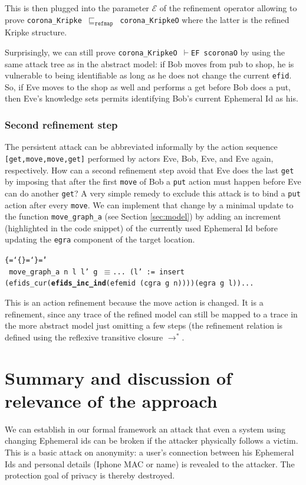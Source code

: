 \documentclass{llncs}
\newenvironment{ttbox}{\begin{alltt}\ttbraces\small\tt}%
                      {\end{alltt}}
\def\ttbraces{\let\.=\nobreak\chardef\{=`\{\chardef\}=`\}\chardef\|=`\\}
\newcommand\ttequiv{\mbox{{$\equiv$}}}
\newcommand\ttrelIstar{\mbox{{$\to^*$}}}
\newcommand\ttvdash{\mbox{{$\vdash$}}}
\newcommand\ttref[1]{\mbox{\(\sqsubseteq_{#1}\)}}
\newcommand\ttecal{\mbox{$\mathcal{E}$}}
\begin{document}
This is then plugged into the parameter \texttt{\ttecal} of the refinement operator allowing to
prove \texttt{corona\_Kripke \ttref{\texttt{refmap}} corona\_KripkeO} where the latter is the
refined Kripke structure.

Surprisingly, we can still prove \texttt{corona\_KripkeO \ttvdash EF scoronaO} by using the
same attack tree as in the abstract model: if Bob moves from pub to shop, he is vulnerable to
being identifiable as long as he does not change the current \texttt{efid}. So, if Eve moves to
the shop as well and performs a get before Bob does a put, then Eve's knowledge sets permits identifying
Bob's current Ephemeral Id as his.

\subsubsection{Second refinement step}
The persistent attack can be abbreviated informally by the action sequence \texttt{[get,move,move,get]}
performed by actors Eve, Bob, Eve, and Eve again, respectively.
How can a second refinement step avoid that Eve does the last \texttt{get} by imposing that after the
first \texttt{move} of Bob a \texttt{put} action must happen before Eve can do another \texttt{get}?
A very simple remedy to exclude this attack is to bind a \texttt{put} action after every \texttt{move}.
We can implement that change by a minimal update to the function \texttt{move\_graph\_a} (see Section \ref{sec:model})
by adding an increment (highlighted in the code snippet)
of the currently used Ephemeral Id before updating the \texttt{egra} component of the target location.
\begin{ttbox}
move\_graph\_a n l l' g \ttequiv ...
  (l' := insert (efids_cur({\bf efids\_inc\_ind}(efemid (cgra g n))))(egra g l))...
\end{ttbox}  
This is an action refinement because the move action is changed. It is a refinement, since
any trace of the refined model can still be mapped to a trace in the more abstract model just
omitting a few steps (the refinement relation is defined using the reflexive transitive closure
\texttt{\ttrelIstar}.


\section{Summary and discussion of relevance of the approach}
\label{sec:concl}
We can establish in our formal framework an attack that even a system using changing
Ephemeral ids can be broken if the attacker physically follows a victim. This is a basic attack on
anonymity: a user's connection between his Ephemeral Ids and personal details (Iphone MAC or name)
is revealed to the attacker. The protection goal of privacy is thereby destroyed.
\end{document}
